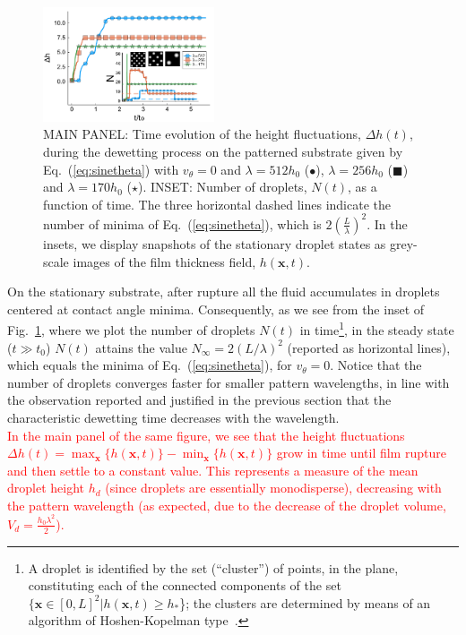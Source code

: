 \documentclass[twocolumn,amsmath,amssymb,showpacs,prl,superscriptaddress]{revtex4-1} %
\begin{document}
\begin{figure}
    \centering
    \includegraphics[width=0.45\textwidth]{Figure_3.pdf}
    \caption{MAIN PANEL: Time evolution of the height fluctuations, $\Delta h(t)$, during the dewetting process on the patterned substrate given by       
    Eq.~(\ref{eq:sinetheta})
    with $v_{\theta}= 0$ and $\lambda= 512 h_0$ (\textcolor{jlblue}{$\bullet$}), $\lambda=256 h_0$ (\textcolor{jlorange}{$\blacksquare$}) and $\lambda=170 h_0$ (\textcolor{jlgreen}{$\star$}).
    INSET: Number of droplets, $N(t)$, as a function of time. The three horizontal dashed lines indicate the number of minima of Eq.~(\ref{eq:sinetheta}),
      which is $2\left(\frac{L}{\lambda}\right)^2$. In the insets, we display snapshots of the stationary droplet states as grey-scale images
      of the film thickness field, $h(\mathbf{x},t)$.
      }
    \label{fig:clusters_v0_sine}
\end{figure}
On the stationary substrate, after rupture all the fluid accumulates in droplets centered at contact angle minima.
Consequently, as we see from the inset of Fig.~\ref{fig:clusters_v0_sine}, where we plot the number of droplets $N(t)$ in time\footnote{A droplet is identified by the set (``cluster'') of points, in the plane, constituting each of the connected components of the set $\{\mathbf{x} \in [0,L]^2 | h(\mathbf{x},t) \geq h_{\ast}$\}; the clusters are determined by means of an algorithm of Hoshen-Kopelman type~\cite{HK}.}, in the steady state ($t \gg t_0$) $N(t)$ attains the value $N_{\infty} = 2(L/\lambda)^2$ (reported as horizontal lines), which equals the minima of Eq.~(\ref{eq:sinetheta}), for $v_{\theta}=0$.
Notice that the number of droplets converges faster for smaller pattern wavelengths, in line with the observation reported and justified in the previous section that the characteristic dewetting time decreases with the wavelength.\\
\textcolor{red}{In the main panel of the same figure, we see that the height fluctuations $\Delta h(t) = \max_{\mathbf{x}}\{h(\mathbf{x},t)\}-\min_{\mathbf{x}}\{h(\mathbf{x},t)\}$
grow in time until film rupture and then settle to a constant value. This represents a measure of the mean droplet height $h_d$ (since
droplets are essentially monodisperse), decreasing with the pattern wavelength (as expected, due to the decrease of the droplet volume,
$V_d = \frac{h_0 \lambda^2}{2}$).}\\
\end{document}
